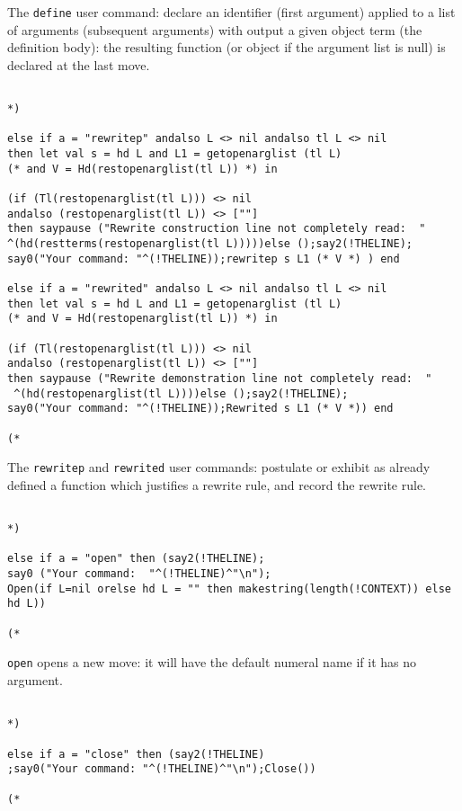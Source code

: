 \documentclass{article}
\begin{document}
The {\tt define} user command:  declare an identifier (first argument) applied to a list of arguments
(subsequent arguments) with output a given object term (the definition body):  the resulting function (or object if the argument list is null) 
is declared at the last move.

\begin{verbatim}

*)

else if a = "rewritep" andalso L <> nil andalso tl L <> nil 
then let val s = hd L and L1 = getopenarglist (tl L) 
(* and V = Hd(restopenarglist(tl L)) *) in 

(if (Tl(restopenarglist(tl L))) <> nil 
andalso (restopenarglist(tl L)) <> [""] 
then saypause ("Rewrite construction line not completely read:  "
^(hd(restterms(restopenarglist(tl L)))))else ();say2(!THELINE);
say0("Your command: "^(!THELINE));rewritep s L1 (* V *) ) end

else if a = "rewrited" andalso L <> nil andalso tl L <> nil 
then let val s = hd L and L1 = getopenarglist (tl L) 
(* and V = Hd(restopenarglist(tl L)) *) in 

(if (Tl(restopenarglist(tl L))) <> nil 
andalso (restopenarglist(tl L)) <> [""] 
then saypause ("Rewrite demonstration line not completely read:  "
 ^(hd(restopenarglist(tl L))))else ();say2(!THELINE);
say0("Your command: "^(!THELINE));Rewrited s L1 (* V *)) end

(*

\end{verbatim}

The {\tt rewritep} and {\tt rewrited} user commands:  postulate or exhibit as already defined a function which justifies a rewrite rule,
and record the rewrite rule.

\begin{verbatim}

*)

else if a = "open" then (say2(!THELINE);
say0 ("Your command:  "^(!THELINE)^"\n"); 
Open(if L=nil orelse hd L = "" then makestring(length(!CONTEXT)) else hd L))

(*

\end{verbatim}

{\tt open} opens a new move:  it will have the default numeral name if it has no argument.

\begin{verbatim}

*)

else if a = "close" then (say2(!THELINE)
;say0("Your command: "^(!THELINE)^"\n");Close())

(*

\end{verbatim}
\end{document}
